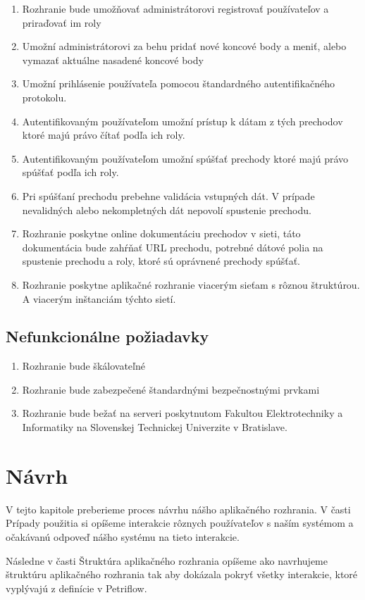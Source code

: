 \begin{enumerate}
\item Rozhranie bude umožňovať administrátorovi registrovať používateľov a priraďovať im roly
\item Umožní administrátorovi za behu pridať nové koncové body a meniť, alebo vymazať aktuálne nasadené koncové body
\item Umožní prihlásenie používateľa pomocou štandardného autentifikačného protokolu.
\item Autentifikovaným používateľom umožní prístup k dátam z tých prechodov ktoré majú právo čítať podľa ich roly.
\item Autentifikovaným používateľom umožní spúšťať prechody ktoré majú právo spúšťať podľa ich roly.
\item Pri spúšťaní prechodu prebehne validácia vstupných dát. V prípade nevalidných alebo nekompletných dát nepovolí spustenie prechodu.
\item Rozhranie poskytne online dokumentáciu prechodov v sieti, táto dokumentácia bude zahŕňať URL prechodu, potrebné dátové polia na spustenie prechodu a roly, ktoré sú oprávnené prechody spúšťať.
\item Rozhranie poskytne aplikačné rozhranie viacerým sieťam s rôznou štruktúrou. A viacerým inštanciám týchto sietí.
\end{enumerate}

\subsection{Nefunkcionálne požiadavky}
\begin{enumerate}
\item Rozhranie bude škálovateľné
\item Rozhranie bude zabezpečené štandardnými bezpečnostnými prvkami
\item Rozhranie bude bežať na serveri poskytnutom Fakultou Elektrotechniky a Informatiky na Slovenskej Technickej Univerzite v Bratislave.
\end{enumerate}

\section{Návrh}
V tejto kapitole preberieme proces návrhu nášho aplikačného rozhrania. V časti Prípady použitia si opíšeme interakcie rôznych používateľov s naším systémom a očakávanú odpoveď nášho systému na tieto interakcie.

Následne v časti Štruktúra aplikačného rozhrania opíšeme ako navrhujeme štruktúru aplikačného rozhrania tak aby dokázala pokryť všetky interakcie, ktoré vyplývajú z definície v Petriflow. 

